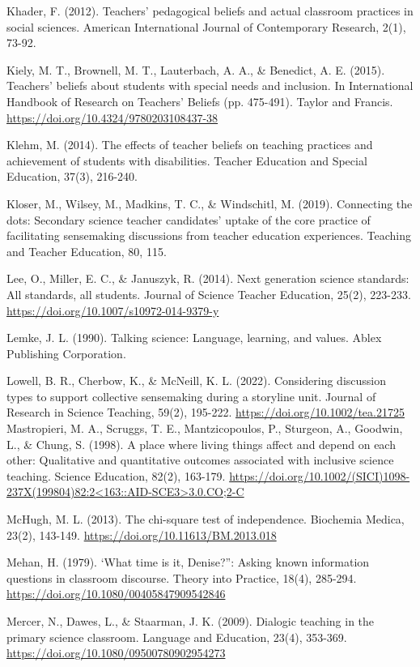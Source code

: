 \documentclass{sig-alternate} %
\begin{document}
Khader, F. (2012). Teachers’ pedagogical beliefs and actual classroom practices in social sciences. American International Journal of Contemporary Research, 2(1), 73-92.

Kiely, M. T., Brownell, M. T., Lauterbach, A. A., \& Benedict, A. E. (2015). Teachers’ beliefs about students with special needs and inclusion. In International Handbook of Research on Teachers' Beliefs (pp. 475-491). Taylor and Francis. \url{https://doi.org/10.4324/9780203108437-38}

Klehm, M. (2014). The effects of teacher beliefs on teaching practices and achievement of students with disabilities. Teacher Education and Special Education, 37(3), 216-240.

Kloser, M., Wilsey, M., Madkins, T. C., \& Windschitl, M. (2019). Connecting the dots: Secondary science teacher candidates’ uptake of the core practice of facilitating sensemaking discussions from teacher education experiences. Teaching and Teacher Education, 80, 115.

Lee, O., Miller, E. C., \& Januszyk, R. (2014). Next generation science standards: All standards, all students. Journal of Science Teacher Education, 25(2), 223-233. \url{https://doi.org/10.1007/s10972-014-9379-y}

Lemke, J. L. (1990). Talking science: Language, learning, and values. Ablex Publishing Corporation.

Lowell, B. R., Cherbow, K., \& McNeill, K. L. (2022). Considering discussion types to support collective sensemaking during a storyline unit. Journal of Research in Science Teaching, 59(2), 195-222. \url{https://doi.org/10.1002/tea.21725}
\newpage
Mastropieri, M. A., Scruggs, T. E., Mantzicopoulos, P., Sturgeon, A., Goodwin, L., \& Chung, S. (1998). A place where living things affect and depend on each other: Qualitative and quantitative outcomes associated with inclusive science teaching. Science Education, 82(2), 163-179. \url{https://doi.org/10.1002/(SICI)1098-237X(199804)82:2<163::AID-SCE3>3.0.CO;2-C}

McHugh, M. L. (2013). The chi-square test of independence. Biochemia Medica, 23(2), 143-149. \url{https://doi.org/10.11613/BM.2013.018}\

Mehan, H. (1979). ‘What time is it, Denise?”: Asking known information questions in classroom discourse. Theory into Practice, 18(4), 285-294. \url{https://doi.org/10.1080/00405847909542846}

Mercer, N., Dawes, L., \& Staarman, J. K. (2009). Dialogic teaching in the primary science classroom. Language and Education, 23(4), 353-369. \url{https://doi.org/10.1080/09500780902954273}
\end{document}
